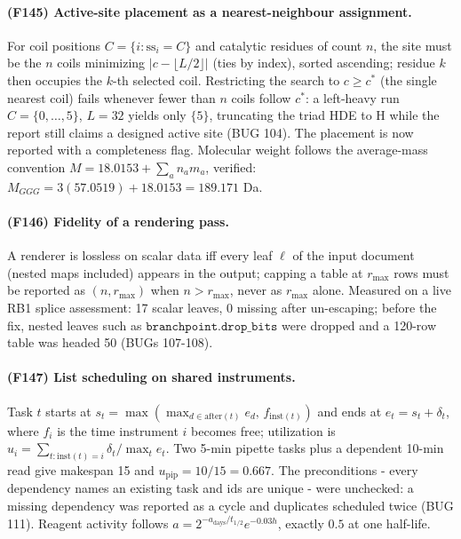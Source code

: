 \paragraph{(F145) Active-site placement as a nearest-neighbour assignment.} For coil positions $C=\{i: \mathrm{ss}_i=C\}$ and catalytic residues of count $n$, the site must be the $n$ coils minimizing $|c-\lfloor L/2\rfloor|$ (ties by index), sorted ascending; residue $k$ then occupies the $k$-th selected coil. Restricting the search to $c\ge c^\ast$ (the single nearest coil) fails whenever fewer than $n$ coils follow $c^\ast$: a left-heavy run $C=\{0,\dots,5\}$, $L=32$ yields only $\{5\}$, truncating the triad HDE to H while the report still claims a designed active site (BUG 104). The placement is now reported with a completeness flag. Molecular weight follows the average-mass convention $M=18.0153+\sum_a n_a m_a$, verified: $M_{GGG}=3(57.0519)+18.0153=189.171$ Da.
\paragraph{(F146) Fidelity of a rendering pass.} A renderer is lossless on scalar data iff every leaf $\ell$ of the input document (nested maps included) appears in the output; capping a table at $r_{\max}$ rows must be reported as $(n, r_{\max})$ when $n>r_{\max}$, never as $r_{\max}$ alone. Measured on a live RB1 splice assessment: 17 scalar leaves, 0 missing after un-escaping; before the fix, nested leaves such as $\texttt{branchpoint.drop\_bits}$ were dropped and a 120-row table was headed 50 (BUGs 107-108).
\paragraph{(F147) List scheduling on shared instruments.} Task $t$ starts at $s_t=\max(\max_{d\in\mathrm{after}(t)} e_d,\, f_{\mathrm{inst}(t)})$ and ends at $e_t=s_t+\delta_t$, where $f_i$ is the time instrument $i$ becomes free; utilization is $u_i=\sum_{t:\mathrm{inst}(t)=i}\delta_t/\max_t e_t$. Two 5-min pipette tasks plus a dependent 10-min read give makespan 15 and $u_{\mathrm{pip}}=10/15=0.667$. The preconditions - every dependency names an existing task and ids are unique - were unchecked: a missing dependency was reported as a cycle and duplicates scheduled twice (BUG 111). Reagent activity follows $a=2^{-a_{\mathrm{days}}/t_{1/2}}e^{-0.03h}$, exactly $0.5$ at one half-life.

